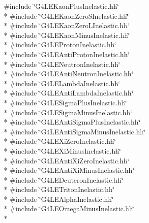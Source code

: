 {\ttfamily \#include \char`\"{}G4\-L\-E\-Kaon\-Plus\-Inelastic.\-hh\char`\"{}}\\*
{\ttfamily \#include \char`\"{}G4\-L\-E\-Kaon\-Zero\-S\-Inelastic.\-hh\char`\"{}}\\*
{\ttfamily \#include \char`\"{}G4\-L\-E\-Kaon\-Zero\-L\-Inelastic.\-hh\char`\"{}}\\*
{\ttfamily \#include \char`\"{}G4\-L\-E\-Kaon\-Minus\-Inelastic.\-hh\char`\"{}}\\*
{\ttfamily \#include \char`\"{}G4\-L\-E\-Proton\-Inelastic.\-hh\char`\"{}}\\*
{\ttfamily \#include \char`\"{}G4\-L\-E\-Anti\-Proton\-Inelastic.\-hh\char`\"{}}\\*
{\ttfamily \#include \char`\"{}G4\-L\-E\-Neutron\-Inelastic.\-hh\char`\"{}}\\*
{\ttfamily \#include \char`\"{}G4\-L\-E\-Anti\-Neutron\-Inelastic.\-hh\char`\"{}}\\*
{\ttfamily \#include \char`\"{}G4\-L\-E\-Lambda\-Inelastic.\-hh\char`\"{}}\\*
{\ttfamily \#include \char`\"{}G4\-L\-E\-Anti\-Lambda\-Inelastic.\-hh\char`\"{}}\\*
{\ttfamily \#include \char`\"{}G4\-L\-E\-Sigma\-Plus\-Inelastic.\-hh\char`\"{}}\\*
{\ttfamily \#include \char`\"{}G4\-L\-E\-Sigma\-Minus\-Inelastic.\-hh\char`\"{}}\\*
{\ttfamily \#include \char`\"{}G4\-L\-E\-Anti\-Sigma\-Plus\-Inelastic.\-hh\char`\"{}}\\*
{\ttfamily \#include \char`\"{}G4\-L\-E\-Anti\-Sigma\-Minus\-Inelastic.\-hh\char`\"{}}\\*
{\ttfamily \#include \char`\"{}G4\-L\-E\-Xi\-Zero\-Inelastic.\-hh\char`\"{}}\\*
{\ttfamily \#include \char`\"{}G4\-L\-E\-Xi\-Minus\-Inelastic.\-hh\char`\"{}}\\*
{\ttfamily \#include \char`\"{}G4\-L\-E\-Anti\-Xi\-Zero\-Inelastic.\-hh\char`\"{}}\\*
{\ttfamily \#include \char`\"{}G4\-L\-E\-Anti\-Xi\-Minus\-Inelastic.\-hh\char`\"{}}\\*
{\ttfamily \#include \char`\"{}G4\-L\-E\-Deuteron\-Inelastic.\-hh\char`\"{}}\\*
{\ttfamily \#include \char`\"{}G4\-L\-E\-Triton\-Inelastic.\-hh\char`\"{}}\\*
{\ttfamily \#include \char`\"{}G4\-L\-E\-Alpha\-Inelastic.\-hh\char`\"{}}\\*
{\ttfamily \#include \char`\"{}G4\-L\-E\-Omega\-Minus\-Inelastic.\-hh\char`\"{}}\\*
